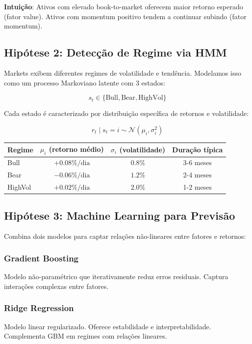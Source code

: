 \documentclass[12pt,a4paper]{article}
\begin{document}
\textbf{Intuição}: Ativos com elevado book-to-market oferecem maior retorno esperado (fator value). Ativos com momentum positivo tendem a continuar subindo (fator momentum).

\subsection{Hipótese 2: Detecção de Regime via HMM}

Markets exibem diferentes regimes de volatilidade e tendência. Modelamos isso como um processo Markoviano latente com 3 estados:

\[
s_t \in \{\text{Bull}, \text{Bear}, \text{HighVol}\}
\]

Cada estado é caracterizado por distribuição específica de retornos e volatilidade:

\[
r_t \mid s_t = i \sim \mathcal{N}(\mu_i, \sigma_i^2)
\]

\begin{table}[h]
\centering
\begin{tabular}{lccc}
\toprule
\textbf{Regime} & $\mu_i$ (retorno médio) & $\sigma_i$ (volatilidade) & Duração típica \\
\midrule
Bull & $+0.08\% / \text{dia}$ & $0.8\%$ & 3-6 meses \\
Bear & $-0.06\% / \text{dia}$ & $1.2\%$ & 2-4 meses \\
HighVol & $+0.02\% / \text{dia}$ & $2.0\%$ & 1-2 meses \\
\bottomrule
\end{tabular}
\end{table}

\subsection{Hipótese 3: Machine Learning para Previsão}

Combina dois modelos para captar relações não-lineares entre fatores e retornos:

\subsubsection{Gradient Boosting}
Modelo não-paramétrico que iterativamente reduz erros residuais. Captura interações complexas entre fatores.

\subsubsection{Ridge Regression}
Modelo linear regularizado. Oferece estabilidade e interpretabilidade. Complementa GBM em regimes com relações lineares.
\end{document}
